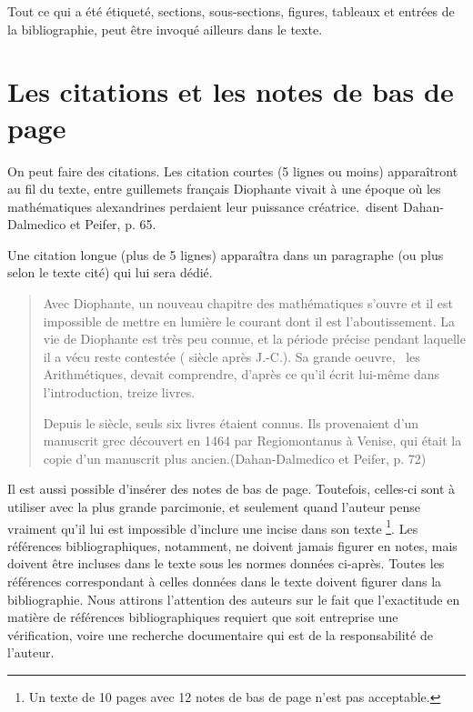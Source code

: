 Tout ce qui a été étiqueté, sections, sous-sections, figures, tableaux et entrées de la bibliographie, peut être invoqué ailleurs dans le texte.


\section{Les citations et les notes de bas de page}\label{sec5}

On peut faire des citations. Les citation courtes (5 lignes ou moins) apparaîtront au fil du texte, entre guillemets français \og Diophante vivait à une époque où les mathématiques alexandrines perdaient leur puissance créatrice.\fg~disent Dahan-Dalmedico et Peifer\cite{daha}, p. 65.

Une citation longue (plus de 5 lignes) apparaîtra dans un paragraphe (ou plus selon le texte cité) qui lui sera dédié.\\ 
 \begin{quote}  Avec Diophante, un nouveau chapitre des mathématiques s'ouvre et il est impossible de mettre en lumière le courant dont il est l'aboutissement. La vie de Diophante est très peu connue, et la période précise pendant laquelle il a vécu reste contestée ( siècle après J.-C.). Sa grande oeuvre, {\ les Arithmétiques}, devait comprendre, d'après ce qu'il écrit lui-même dans l'introduction, treize livres.
 
 Depuis le  siècle, seuls six livres étaient connus. Ils provenaient d'un manuscrit grec découvert en 1464 par Regiomontanus à Venise, qui était la copie d'un manuscrit plus ancien.(Dahan-Dalmedico et Peifer\cite{daha}, p. 72)\end{quote} 
 
Il est aussi possible d'insérer des notes de bas de page. Toutefois, celles-ci sont à utiliser avec la plus grande parcimonie, et seulement quand l'auteur pense vraiment qu'il lui est impossible d'inclure une incise dans son texte \footnote {Un texte de 10 pages avec 12 notes de bas de page n'est pas acceptable.}. Les références bibliographiques, notamment, ne doivent jamais figurer en notes, mais doivent être incluses dans le texte sous les normes données ci-après. Toutes les références correspondant à celles données dans le texte doivent figurer dans la bibliographie. Nous attirons l'attention des auteurs sur le fait que l'exactitude en matière de références bibliographiques requiert que soit entreprise une vérification, voire une recherche documentaire qui est de la responsabilité de l'auteur. 



